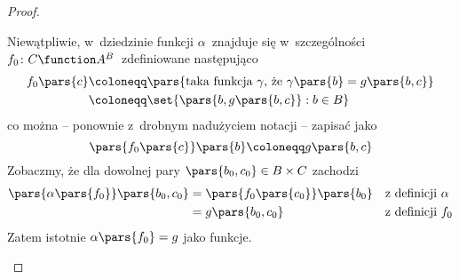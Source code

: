 \begin{proof}
\begin{description}
        Niewątpliwie, w~dziedzinie funkcji \(\alpha\)~znajduje się w~szczególności \(f_0\colon C \function A^B\)~zdefiniowane następująco
        \begin{equation*}
            \begin{split}
                f_0\pars{c}
                    &\coloneqq \pars{\text{taka funkcja \(\gamma\), że \(\gamma\pars{b} = g\pars{b, c}\)}}\\
                    &\coloneqq \set{\pars{b, g\pars{b, c}} : b \in B}
            \end{split}
        \end{equation*}
        co można -- ponownie z~drobnym nadużyciem notacji -- zapisać jako
        \begin{equation*}
            \pars{f_0\pars{c}}\pars{b} \coloneqq g\pars{b, c}
        \end{equation*}
        Zobaczmy, że dla dowolnej pary \(\pars{b_0, c_0} \in B \times C\) zachodzi
        \begin{align*}
            \pars{\alpha\pars{f_0}}\pars{b_0, c_0}
                &= \pars{f_0\pars{c_0}}\pars{b_0} && \text{z~definicji \(\alpha\)}\\
                &= g\pars{b_0, c_0} && \text{z~definicji \(f_0\)}
        \end{align*}
        Zatem istotnie \(\alpha\pars{f_0} = g\) jako funkcje.
\end{description}
\end{proof}